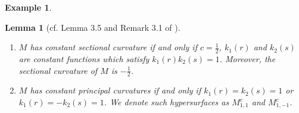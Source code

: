 \documentclass[reqno]{amsart}%
\newtheorem{lemma}[theorem]{Lemma}
\theoremstyle{definition}
\newtheorem{example}[theorem]{Example}
\numberwithin{equation}{section}
\begin{document}
\begin{example}
\begin{lemma}[cf. Lemma 3.5 and Remark 3.1 of \cite{GMY}]
\begin{enumerate}
\item[(2)]
$M$ has constant sectional curvature if and only if $c=\frac{1}{2}$, $k_1(r)$ and
$k_2(s)$ are constant functions which satisfy $k_1(r) k_2(s)=1$.
Moreover, the sectional curvature of $M$ is $-\frac{1}{2}$.

\item[(3)]
$M$ has constant principal curvatures if and only if $k_1(r)=k_2(s)=1$ or
$k_1(r)=-k_2(s)=1$. We denote such hypersurfaces as $M_{1,1}^c$ and $M_{1,-1}^c$.
\end{enumerate}
\end{lemma}
\end{example}



















%
%
\end{document}
